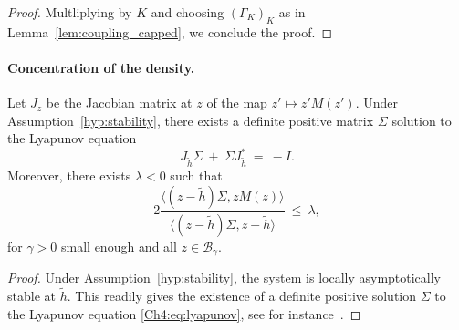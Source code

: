 \begin{refsegment}
\begin{proof}
    Multliplying by $K$ and choosing $(\Gamma_K)_K$ as in Lemma~\ref{lem:coupling_capped}, we
 conclude the proof. 
 \end{proof}

 \paragraph{Concentration of the density.}

\begin{lem}\label{lem:algebra}
  Let $J_z$ be the Jacobian matrix at $z$ of the map $z' \mapsto z'M(z')$. Under Assumption~\ref{hyp:stability}, there exists a definite positive matrix $\Sigma$ solution to the Lyapunov equation
\begin{equation}\label{Ch4:eq:lyapunov}
J_{\tilde h} \Sigma\ +\ \Sigma J^*_{\tilde h}\ =\ -I.
\end{equation}
Moreover, there exists $\lambda<0$ such that 
\begin{equation}\label{Ch4:eq:quadratic_functional_inequality}
2\frac{\langle (z-\tilde h)\Sigma, z M(z) \rangle}{\langle (z-\tilde h)\Sigma, z -\tilde h \rangle}\ \leq\  \lambda,
\end{equation}
for $\gamma>0$ small enough and all $z\in \mathscr{B}_\gamma$.
\end{lem}
\begin{proof}
Under Assumption~\ref{hyp:stability}, the system is locally asymptotically stable at $\tilde h$. This readily gives the existence of  a definite positive solution $\Sigma$ to the Lyapunov equation \eqref{Ch4:eq:lyapunov}, see for instance~\citet[Theorem 4.6]{khalil_nonlinear_2002}. 


\end{proof}
\end{refsegment}
